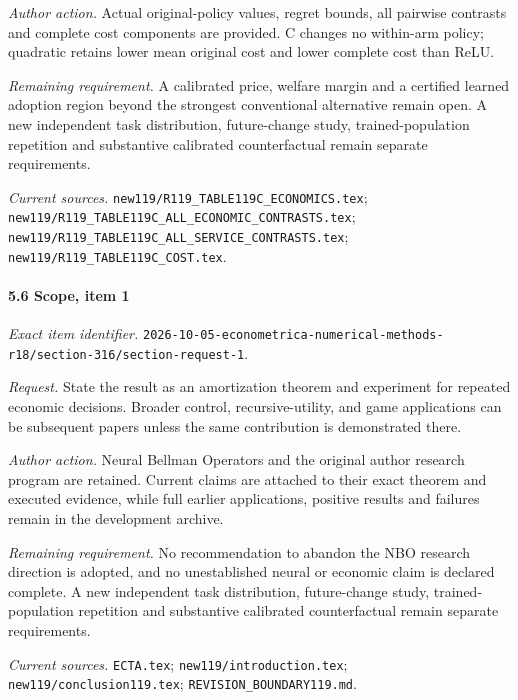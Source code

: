 \par\emph{Author action.} Actual original-policy values, regret bounds, all pairwise contrasts and complete cost components are provided. C changes no within-arm policy; quadratic retains lower mean original cost and lower complete cost than ReLU.

\par\emph{Remaining requirement.} A calibrated price, welfare margin and a certified learned adoption region beyond the strongest conventional alternative remain open. A new independent task distribution, future-change study, trained-population repetition and substantive calibrated counterfactual remain separate requirements.

\par\emph{Current sources.} \nolinkurl{new119/R119_TABLE119C_ECONOMICS.tex}; \nolinkurl{new119/R119_TABLE119C_ALL_ECONOMIC_CONTRASTS.tex}; \nolinkurl{new119/R119_TABLE119C_ALL_SERVICE_CONTRASTS.tex}; \nolinkurl{new119/R119_TABLE119C_COST.tex}.

\paragraph{5.6 Scope, item 1}

\emph{Exact item identifier.} \nolinkurl{2026-10-05-econometrica-numerical-methods-r18/section-316/section-request-1}.

\par\emph{Request.} State the result as an amortization theorem and experiment for repeated economic decisions. Broader control, recursive-utility, and game applications can be subsequent papers unless the same contribution is demonstrated there.

\par\emph{Author action.} Neural Bellman Operators and the original author research program are retained. Current claims are attached to their exact theorem and executed evidence, while full earlier applications, positive results and failures remain in the development archive.

\par\emph{Remaining requirement.} No recommendation to abandon the NBO research direction is adopted, and no unestablished neural or economic claim is declared complete. A new independent task distribution, future-change study, trained-population repetition and substantive calibrated counterfactual remain separate requirements.

\par\emph{Current sources.} \nolinkurl{ECTA.tex}; \nolinkurl{new119/introduction.tex}; \nolinkurl{new119/conclusion119.tex}; \nolinkurl{REVISION_BOUNDARY119.md}.

